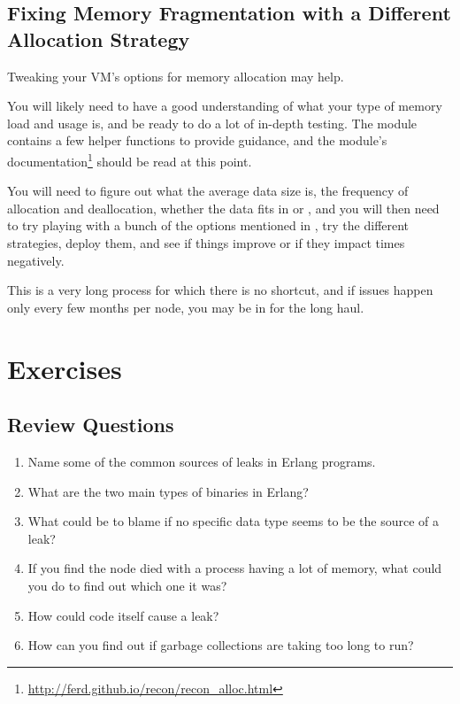 \documentclass[11pt, oneside]{book}   	%
\begin{document}
\subsection{Fixing Memory Fragmentation with a Different Allocation Strategy}

Tweaking your VM's options for memory allocation may help.

You will likely need to have a good understanding of what your type of memory load and usage is, and be ready to do a lot of in-depth testing. The  module contains a few helper functions to provide guidance, and the module's documentation\footnote{\href{http://ferd.github.io/recon/recon\_alloc.html}{http://ferd.github.io/recon/recon\_alloc.html}} should be read at this point.

You will need to figure out what the average data size is, the frequency of allocation and deallocation, whether the data fits in  or ,  and you will then need to try playing with a bunch of the options mentioned in , try the different strategies, deploy them, and see if things improve or if they impact times negatively.

This is a very long process for which there is no shortcut, and if issues happen only every few months per node, you may be in for the long haul. 


\section{Exercises}

\subsection*{Review Questions}

\begin{enumerate}
	\item Name some of the common sources of leaks in Erlang programs.
	\item What are the two main types of binaries in Erlang?
	\item What could be to blame if no specific data type seems to be the source of a leak?
	\item If you find the node died with a process having a lot of memory, what could you do to find out which one it was?
	\item How could code itself cause a leak?
	\item How can you find out if garbage collections are taking too long to run?
\end{enumerate}
\end{document}
